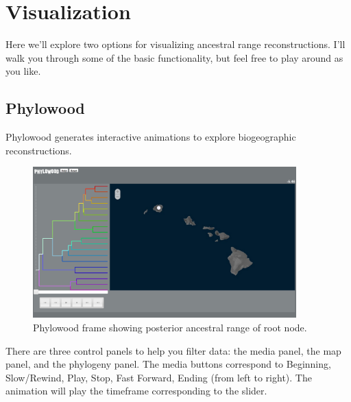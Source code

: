 \section{Visualization}

Here we'll explore two options for visualizing ancestral range reconstructions.
I'll walk you through some of the basic functionality, but feel free to play around as you like.

\subsection{Phylowood}

Phylowood generates interactive animations to explore biogeographic reconstructions.



\begin{figure}[H]
\centering
\includegraphics[width=4in]{../RB_Biogeography_Tutorial/figures/phw_mrca}
\caption{Phylowood frame showing posterior ancestral range of root node.}
\end{figure}


There are three control panels to help you filter data: the media panel, the map panel, and the phylogeny panel.
The media buttons correspond to Beginning, Slow/Rewind, Play, Stop, Fast Forward, Ending (from left to right).
The animation will play the timeframe corresponding to the slider.



